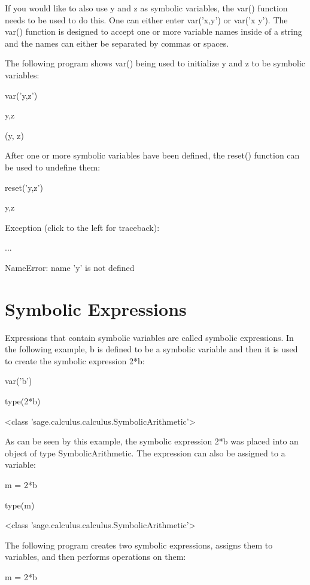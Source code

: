 \documentclass[12pt,oneside]{book}
\begin{document}
If you would like to also use y and z as symbolic variables, the var() function needs to be used to do this. One can either enter var('x,y') or var('x y'). The var() function is designed to accept one or more variable names inside of a string and the names can either be separated by commas or spaces. 

The following program shows var() being used to initialize y and z to be symbolic variables: 

var('y,z')

y,z

{\textbar}

(y, z)

After one or more symbolic variables have been defined, the reset() function can be used to undefine them: 

reset('y,z')

y,z

{\textbar}

Exception (click to the left for traceback):

...

NameError: name 'y' is not defined

\section[Symbolic Expressions]{Symbolic Expressions}

Expressions that contain symbolic variables are called symbolic expressions. In the following example, b is defined to be a symbolic variable and then it is used to create the symbolic expression 2*b: 

var('b')

type(2*b)

{\textbar}

{\textless}class 'sage.calculus.calculus.SymbolicArithmetic'{\textgreater}

As can be seen by this example, the symbolic expression 2*b was placed into an object of type SymbolicArithmetic. The expression can also be assigned to a variable: 

m = 2*b

type(m)

{\textbar}

{\textless}class 'sage.calculus.calculus.SymbolicArithmetic'{\textgreater}

The following program creates two symbolic expressions, assigns them to variables, and then performs operations on them: 

m = 2*b
\end{document}
